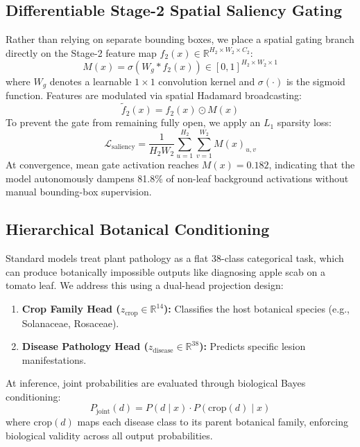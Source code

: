 \documentclass[conference]{IEEEtran}
\begin{document}
\subsection{Differentiable Stage-2 Spatial Saliency Gating}
Rather than relying on separate bounding boxes, we place a spatial gating branch directly on the Stage-2 feature map $f_2(x) \in \mathbb{R}^{H_2 \times W_2 \times C_2}$:
\begin{equation}
M(x) = \sigma(W_g * f_2(x)) \in [0, 1]^{H_2 \times W_2 \times 1}
\end{equation}
where $W_g$ denotes a learnable $1 \times 1$ convolution kernel and $\sigma(\cdot)$ is the sigmoid function. Features are modulated via spatial Hadamard broadcasting:
\begin{equation}
\tilde{f}_2(x) = f_2(x) \odot M(x)
\end{equation}
To prevent the gate from remaining fully open, we apply an $L_1$ sparsity loss:
\begin{equation}
\mathcal{L}_{\text{saliency}} = \frac{1}{H_2 W_2} \sum_{u=1}^{H_2} \sum_{v=1}^{W_2} M(x)_{u,v}
\end{equation}
At convergence, mean gate activation reaches $M(x) = 0.182$, indicating that the model autonomously dampens 81.8\% of non-leaf background activations without manual bounding-box supervision.

\subsection{Hierarchical Botanical Conditioning}
Standard models treat plant pathology as a flat 38-class categorical task, which can produce botanically impossible outputs like diagnosing apple scab on a tomato leaf. We address this using a dual-head projection design:
\begin{enumerate}
    \item \textbf{Crop Family Head ($z_{\text{crop}} \in \mathbb{R}^{14}$):} Classifies the host botanical species (e.g., Solanaceae, Rosaceae).
    \item \textbf{Disease Pathology Head ($z_{\text{disease}} \in \mathbb{R}^{38}$):} Predicts specific lesion manifestations.
\end{enumerate}
At inference, joint probabilities are evaluated through biological Bayes conditioning:
\begin{equation}
P_{\text{joint}}(d) = P(d \mid x) \cdot P(\text{crop}(d) \mid x)
\end{equation}
where $\text{crop}(d)$ maps each disease class to its parent botanical family, enforcing biological validity across all output probabilities.
\end{document}
